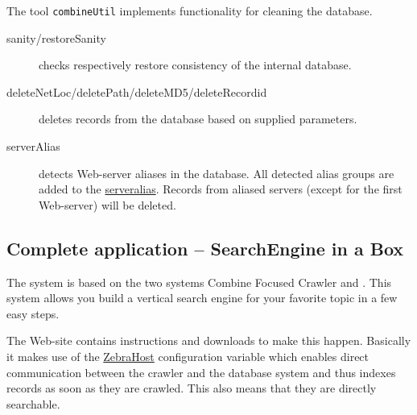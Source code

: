 The tool {\tt combineUtil} implements functionality for cleaning the database.

\begin{description}
\item[sanity/restoreSanity] checks respectively restore
 consistency of the internal database.

\item[deleteNetLoc/deletePath/deleteMD5/deleteRecordid] deletes
records from the data\-base based on supplied parameters.

\item[serverAlias] detects Web-server aliases in the database.
All detected alias groups are added to the \hyperref{serveralias configuration}{serveralias configuration (section }{)}{serveralias}.
Records from aliased servers (except for the first Web-server) will be deleted.
\end{description}

\subsection{Complete application -- SearchEngine in a Box}

The
 system is based on the two systems Combine Focused Crawler and
 . This system allows you build
 a vertical search engine for your favorite topic in a few easy
 steps.

The  Web-site contains instructions and downloads
to make this happen. Basically it makes use of the
\hyperref{ZebraHost}{ZebraHost (see section }{)}{ZebraHost}
configuration variable which enables direct communication between
the crawler and the database system and thus indexes records as soon
as they are crawled. This also means that they are directly searchable.
